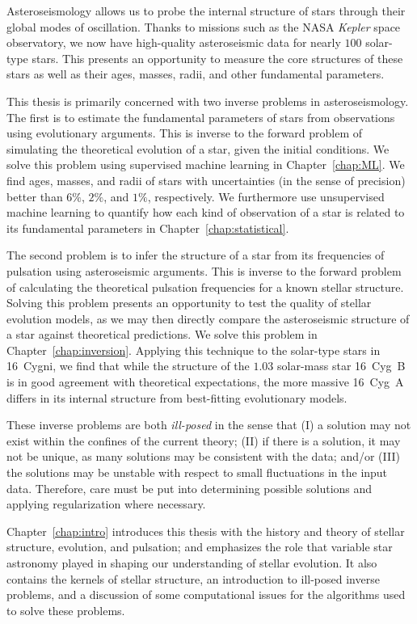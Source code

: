 Asteroseismology allows us to probe the internal structure of stars through their global modes of oscillation. 
Thanks to missions such as the NASA \emph{Kepler} space observatory, we now have high-quality asteroseismic data for nearly $100$ solar-type stars. 
This presents an opportunity to measure the core structures of these stars as well as their ages, masses, radii, and other fundamental parameters. 

This thesis is primarily concerned with two inverse problems in asteroseismology. 
The first is to estimate the fundamental parameters of stars from observations using evolutionary arguments. 
This is inverse to the forward problem of simulating the theoretical evolution of a star, given the initial conditions. 
We solve this problem using supervised machine learning in Chapter~\ref{chap:ML}. 
We find ages, masses, and radii of stars with uncertainties (in the sense of precision) better than $6\%$, $2\%$, and $1\%$, respectively. 
We furthermore use unsupervised machine learning to quantify how each kind of observation of a star is related to its fundamental parameters in Chapter~\ref{chap:statistical}. 

The second problem is to infer the structure of a star from its frequencies of pulsation using asteroseismic arguments. 
This is inverse to the forward problem of calculating the theoretical pulsation frequencies for a known stellar structure. 
Solving this problem presents an opportunity to test the quality of stellar evolution models, as we may then directly compare the asteroseismic structure of a star against theoretical predictions. 
We solve this problem in Chapter~\ref{chap:inversion}. 
Applying this technique to the solar-type stars in 16~Cygni, we find that while the structure of the $1.03$ solar-mass star 16~Cyg~B is in good agreement with theoretical expectations, the more massive 16~Cyg~A differs in its internal structure from best-fitting evolutionary models. 

These inverse problems are both \emph{ill-posed} in the sense that (I) a solution may not exist within the confines of the current theory; (II) if there is a solution, it may not be unique, as many solutions may be consistent with the data; and/or (III) the solutions may be unstable with respect to small fluctuations in the input data. 
Therefore, care must be put into determining possible solutions and applying regularization where necessary. 

Chapter~\ref{chap:intro} introduces this thesis with the history and theory of stellar structure, evolution, and pulsation; and emphasizes the role that variable star astronomy played in shaping our understanding of stellar evolution. 
It also contains the kernels of stellar structure, an introduction to ill-posed inverse problems, and a discussion of some computational issues for the algorithms used to solve these problems. 
